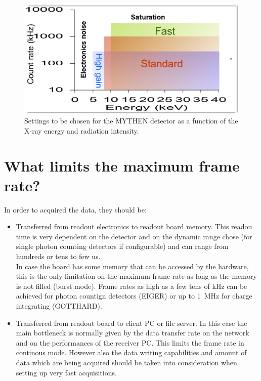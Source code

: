 \begin{figure}
\caption{Settings to be chosen for the MYTHEN detector as a function of the X-ray energy and radiation intensity.}\label{fig:mythensett}
\includegraphics[width=\textwidth]{images/settings}
\end{figure} 



\section{What limits the maximum frame rate?}

In order to acquired the data, they should be:
\begin{itemize}
\item Transferred from readout electronics to readout board memory. This readou time is very dependent on the detector and on the dynamic range chose (for single photon counting detectors if configurable) and can range from hundreds or tens to few us. \\
In case the board has some memory that can be accessed by the hardware, this is the only limitation on the maximum frame rate as long as the memory is not filled (burst mode). Frame rates as high as a few tens of kHz can be achieved for photon countign detectors (EIGER) or up to 1~MHz for charge integrating (GOTTHARD).

\item Transferred from readout board to client PC or file server. In this case the main bottleneck is normally given by the data transfer rate on the network and on the performances of the receiver PC. This limits the frame rate in continous mode. However also the data writing capabilities and amount of data which are being acquired should be taken into consideration when setting up very fast acquisitions.

\end{itemize}

